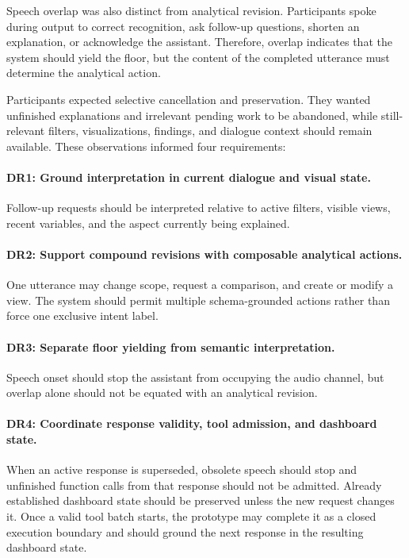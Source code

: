 \documentclass[journal]{IEEEtran}
\begin{document}
Speech overlap was also distinct from analytical revision. Participants spoke during output to correct recognition, ask follow-up questions, shorten an explanation, or acknowledge the assistant. Therefore, overlap indicates that the system should yield the floor, but the content of the completed utterance must determine the analytical action.

Participants expected selective cancellation and preservation. They wanted unfinished explanations and irrelevant pending work to be abandoned, while still-relevant filters, visualizations, findings, and dialogue context should remain available. These observations informed four requirements:

\paragraph{DR1: Ground interpretation in current dialogue and visual state.}
Follow-up requests should be interpreted relative to active filters, visible views, recent variables, and the aspect currently being explained.

\paragraph{DR2: Support compound revisions with composable analytical actions.}
One utterance may change scope, request a comparison, and create or modify a view. The system should permit multiple schema-grounded actions rather than force one exclusive intent label.

\paragraph{DR3: Separate floor yielding from semantic interpretation.}
Speech onset should stop the assistant from occupying the audio channel, but overlap alone should not be equated with an analytical revision.

\paragraph{DR4: Coordinate response validity, tool admission, and dashboard state.}
When an active response is superseded, obsolete speech should stop and unfinished function calls from that response should not be admitted. Already established dashboard state should be preserved unless the new request changes it. Once a valid tool batch starts, the prototype may complete it as a closed execution boundary and should ground the next response in the resulting dashboard state.
\end{document}
